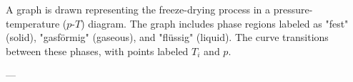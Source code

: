 A graph is drawn representing the freeze-drying process in a pressure-temperature (\( p \)-\( T \)) diagram. The graph includes phase regions labeled as "fest" (solid), "gasförmig" (gaseous), and "flüssig" (liquid). The curve transitions between these phases, with points labeled \( T_i \) and \( p \).  

---